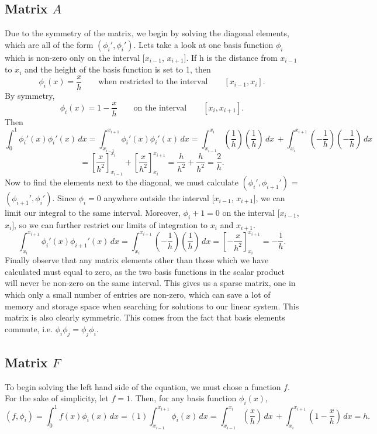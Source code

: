 \documentclass{article}
\begin{document}
\subsection{Matrix $A$}
Due to the symmetry of the matrix, we begin by solving the diagonal elements, which are all of the form $(\phi_i',\phi_i')$. Lets take a look at one basis function $\phi_i$ which is non-zero only on the interval $[x_{i-1}$, $x_{i+1}]$. If h is the distance from $x_{i-1}$ to $x_{i}$ and the height of the basis function is set to 1, then $$\phi_i(x) = \frac{x}{h}\qquad \textrm{when restricted to the interval} \qquad[x_{i-1}, x_{i}].$$ By symmetry, $$\phi_i(x) = 1 - \frac{x}{h} \qquad \textrm{on the interval}\qquad [x_{i}, x_{i+1}].$$  Then 
$$\int_{0}^{1} \phi_i'(x)\phi_i'(x) \,dx = \int_{x_{i-1}}^{x_{i+1}} \phi_i'(x)\phi_i'(x) \,dx = \int_{x_{i-1}}^{x_{i}} \left(\frac{1}{h}\right)\left(\frac{1}{h}\right)\,dx\, + \int_{x_{i}}^{x_{i+1}} \left(-\frac{1}{h}\right)\left(-\frac{1}{h}\right) \,dx $$ 
$$= \left[\frac{x}{h^2}\right]_{x_{i-1}}^{x_{i}} + \left[\frac{x}{h^2}\right]_{x_{i}}^{x_{i+1}} = \frac{h}{h^2} + \frac{h}{h^2} = \frac{2}{h}.$$ 
Now to find the elements next to the diagonal, we must calculate $(\phi_i',\phi_{i+1}')$ = $(\phi_{i+1}',\phi_i')$. Since $\phi_i = 0$ anywhere outside the interval $[x_{i-1}$, $x_{i+1}]$, we can limit our integral to the same interval. Moreover, $\phi_i+1 = 0$ on the interval $[x_{i-1}$, $x_{i}]$, so we can further restrict our limits of integration to $x_{i}$ and $x_{i+1}$. 
$$\int_{x_{i}}^{x_{i+1}} \phi_i'(x)\phi_{i+1}'(x) \,dx = \int_{x_{i}}^{x_{i+1}} \left(-\frac{1}{h}\right)\left(\frac{1}{h}\right)\,dx  = \left[-\frac{x}{h^2}\right]_{x_{i}}^{x_{i+1}} = -\frac{1}{h}.$$ 
Finally observe that any matrix elements other than those which we have calculated must equal to zero, as the two basis functions in the scalar product will never be non-zero on the same interval. This gives us a sparse matrix, one in which only a small number of entries are non-zero, which can save a lot of memory and storage space when searching for solutions to our linear system. This matrix is also clearly symmetric. This comes from the fact that basis elements commute, i.e. $\phi_i \phi_j = \phi_j \phi_i$.
\subsection{Matrix $F$}
To begin solving the left hand side of the equation, we must chose a function $f$. For the sake of simplicity, let $f = 1$. Then, for any basis function $\phi_i(x)$, $$(f , \phi_i) = \int_{0}^{1} f(x)\phi_i(x) \,dx  = (1) \int_{x_{i-1}}^{x_{i+1}} \phi_i(x) \,dx =  \int_{x_{i-1}}^{x_{i}} \left(\frac{x}{h}\right)\,dx\, + \int_{x_{i}}^{x_{i+1}} \left(1 -\frac{x}{h}\right) \,dx =  h.$$ 
\\
\end{document}
